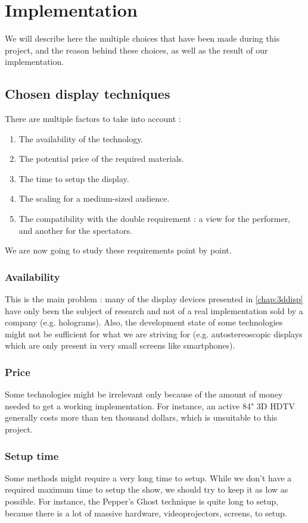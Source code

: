 \section{Implementation}
We will describe here the multiple choices that have been made during this project, and the reason behind these choices, as well as the result of our implementation.

\subsection{Chosen display techniques}
There are multiple factors to take into account : 
\begin{enumerate}
\item The availability of the technology.
\item The potential price of the required materials.
\item The time to setup the display.
\item The scaling for a medium-sized audience.
\item The compatibility with the double requirement : a view for the performer, and another for the spectators.
\end{enumerate}

We are now going to study these requirements point by point.
\subsubsection{Availability}
This is the main problem : many of the display devices presented in \ref{chap:3ddisp} have only been the subject of research and not of a real implementation sold by a company (e.g. holograms). Also, the development state of some technologies  might not be sufficient for what we are striving for (e.g. autostereoscopic displays which are only present in very small screens like smartphones).
\subsubsection{Price}
Some technologies might be irrelevant only because of the amount of money needed to get a working implementation. For instance, an active 84" 3D HDTV generally costs more than ten thousand dollars, which is unsuitable to this project.
\subsubsection{Setup time}
Some methods might require a very long time to setup. While we don't have a required maximum time to setup the show, we should try to keep it as low as possible. For instance, the Pepper's Ghost technique is quite long to setup, because there is a lot of massive hardware, videoprojectors, screens, to setup.
